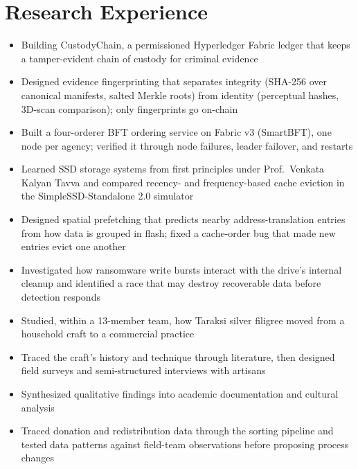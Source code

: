 \section{Research Experience}
\begin{itemize}
  \item Building CustodyChain, a permissioned Hyperledger Fabric ledger that keeps a tamper-evident chain of custody for criminal evidence
  \item Designed evidence fingerprinting that separates integrity (SHA-256 over canonical manifests, salted Merkle roots) from identity (perceptual hashes, 3D-scan comparison); only fingerprints go on-chain
  \item Built a four-orderer BFT ordering service on Fabric v3 (SmartBFT), one node per agency; verified it through node failures, leader failover, and restarts
\end{itemize}
\begin{itemize}
  \item Learned SSD storage systems from first principles under Prof.\ Venkata Kalyan Tavva and compared recency- and frequency-based cache eviction in the SimpleSSD-Standalone 2.0 simulator
  \item Designed spatial prefetching that predicts nearby address-translation entries from how data is grouped in flash; fixed a cache-order bug that made new entries evict one another
  \item Investigated how ransomware write bursts interact with the drive's internal cleanup and identified a race that may destroy recoverable data before detection responds
\end{itemize}
\begin{itemize}
  \item Studied, within a 13-member team, how Taraksi silver filigree moved from a household craft to a commercial practice
  \item Traced the craft's history and technique through literature, then designed field surveys and semi-structured interviews with artisans
  \item Synthesized qualitative findings into academic documentation and cultural analysis
\end{itemize}
\begin{itemize}
  \item Traced donation and redistribution data through the sorting pipeline and tested data patterns against field-team observations before proposing process changes
\end{itemize}
